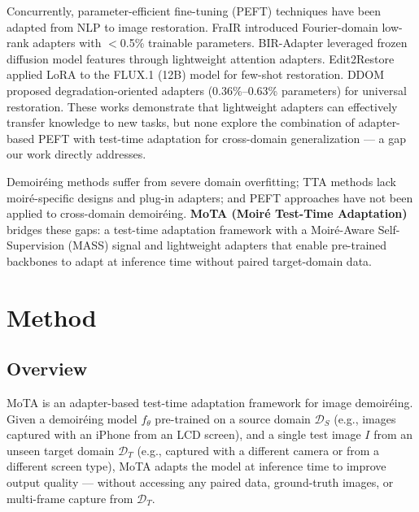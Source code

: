 \documentclass[10pt,twocolumn,letterpaper]{article}
\begin{document}
Concurrently, parameter-efficient fine-tuning (PEFT) techniques have been adapted from NLP to image restoration. FraIR \cite{anonymous2026frair} introduced Fourier-domain low-rank adapters with $<$0.5\% trainable parameters. BIR-Adapter \cite{anonymous2025biradapter} leveraged frozen diffusion model features through lightweight attention adapters. Edit2Restore \cite{anonymous2026edit2restore} applied LoRA to the FLUX.1 (12B) model for few-shot restoration. DDOM \cite{anonymous2026ddom} proposed degradation-oriented adapters (0.36\%--0.63\% parameters) for universal restoration. These works demonstrate that lightweight adapters can effectively transfer knowledge to new tasks, but none explore the combination of adapter-based PEFT with test-time adaptation for cross-domain generalization --- a gap our work directly addresses.

Demoir\'{e}ing methods suffer from severe domain overfitting; TTA methods lack moir\'{e}-specific designs and plug-in adapters; and PEFT approaches have not been applied to cross-domain demoir\'{e}ing. \textbf{MoTA (Moir\'{e} Test-Time Adaptation)} bridges these gaps: a test-time adaptation framework with a Moir\'{e}-Aware Self-Supervision (MASS) signal and lightweight adapters that enable pre-trained backbones to adapt at inference time without paired target-domain data.


\section{Method}

\FloatBarrier
\subsection{Overview}

MoTA is an adapter-based test-time adaptation framework for image demoir\'{e}ing. Given a demoir\'{e}ing model $f_\theta$ pre-trained on a source domain $\mathcal{D}_S$ (e.g., images captured with an iPhone from an LCD screen), and a single test image $I$ from an unseen target domain $\mathcal{D}_T$ (e.g., captured with a different camera or from a different screen type), MoTA adapts the model at inference time to improve output quality --- without accessing any paired data, ground-truth images, or multi-frame capture from $\mathcal{D}_T$.
\end{document}
